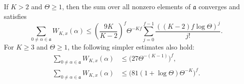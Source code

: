 \begin{theorem}\label{gt-smoothed}
If $K>2$ and $\Theta\geq1$, then the sum over all nonzero elements
of $\mathfrak a$ converges and satisfies
\begin{equation}\label{gt-smoothed-exact}
 \sum_{0\ne\alpha\in\mathfrak a}W_{K,x}(\alpha)
 \leq
 \left(\frac{9K}{K-2}\right)^f\Theta^{-Kf}
 \sum_{j=0}^{f-1}\frac{((K-2)f\log\Theta)^j}{j!}.
\end{equation}
For $K\geq3$ and $\Theta\geq1$, the following simpler estimates
also hold:
\begin{align}
 \sum_{0\ne\alpha\in\mathfrak a}W_{K,x}(\alpha)
    &\leq\bigl(27\Theta^{-(K-1)}\bigr)^f,
       \label{gt-smoothed-simple}\\
 \sum_{0\ne\alpha\in\mathfrak a}W_{K,x}(\alpha)
    &\leq\bigl(81(1+\log\Theta)\Theta^{-K}\bigr)^f.
       \label{gt-smoothed-log}
\end{align}
\end{theorem}

